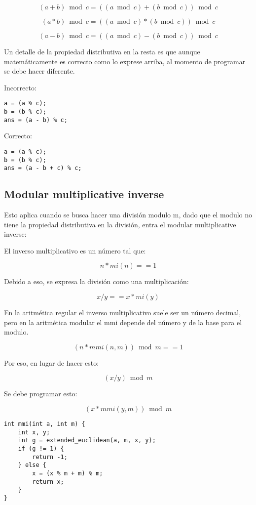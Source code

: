 \documentclass[10pt]{article}
\begin{document}
\[ (a + b) \bmod c = ((a \bmod c) + (b \bmod c)) \bmod c \]

\[ (a * b) \bmod c = ((a \bmod c) * (b \bmod c)) \bmod c \]

\[ (a - b) \bmod c = ((a \bmod c) - (b \bmod c)) \bmod c \]

Un detalle de la propiedad distributiva en la resta es que aunque matemáticamente es correcto como lo exprese arriba, al momento de programar se debe hacer diferente.

Incorrecto:

\begin{lstlisting}
a = (a % c);
b = (b % c);
ans = (a - b) % c;
\end{lstlisting}

Correcto:

\begin{lstlisting}
a = (a % c);
b = (b % c);
ans = (a - b + c) % c;
\end{lstlisting}

\subsection{Modular multiplicative inverse}

Esto aplica cuando se busca hacer una división modulo m, dado que el modulo no tiene la propiedad distributiva en la división, entra el modular multiplicative inverse:

El inverso multiplicativo es un número tal que:

\[ n * mi(n) == 1 \]

Debido a eso, se expresa la división como una multiplicación:

\[ x / y == x * mi(y) \]

En la aritmética regular el inverso multiplicativo suele ser un número decimal, pero en la aritmética modular el mmi depende del número y de la base para el modulo.

\[ (n * mmi(n, m)) \bmod m == 1 \]

Por eso, en lugar de hacer esto:

\[ (x / y) \bmod m \]

Se debe programar esto:

\[ (x * mmi(y, m)) \bmod m \]

\begin{lstlisting}
int mmi(int a, int m) {
    int x, y;
    int g = extended_euclidean(a, m, x, y);
    if (g != 1) {
        return -1;
    } else {
        x = (x % m + m) % m;
        return x;
    }
}
\end{lstlisting}
\end{document}
